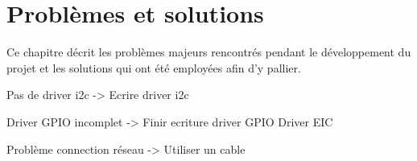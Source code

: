 
\chapter{Problèmes et solutions}\label{ch:prob_solutions}

Ce chapitre décrit les problèmes majeurs rencontrés pendant le développement du projet et les solutions qui ont été employées afin d'y pallier.

Pas de driver i2c -> Ecrire driver i2c

Driver GPIO incomplet -> Finir ecriture driver GPIO
Driver EIC

Problème connection réseau -> Utiliser un cable
